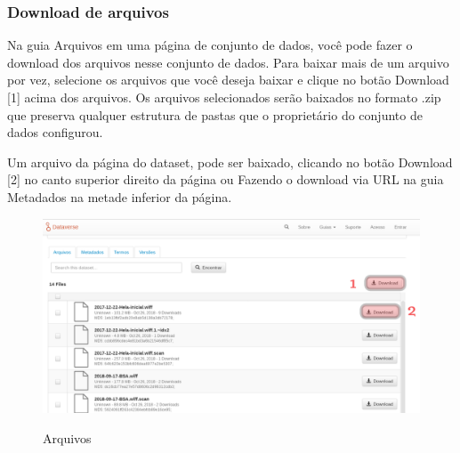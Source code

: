 \documentclass[12pt,hidelinks]{article}
\begin{document}

    	\subsubsection{Download de arquivos}
    	
\qquad Na guia Arquivos em uma página de conjunto de dados, você pode fazer o download dos arquivos nesse conjunto de dados. Para baixar mais de um arquivo por vez, selecione os arquivos que você deseja baixar e clique no botão Download [1] acima dos arquivos. Os arquivos selecionados serão baixados no formato .zip que preserva qualquer estrutura de pastas que o proprietário do conjunto de dados configurou.

Um arquivo da página do dataset, pode ser baixado, clicando no botão Download [2] no canto superior direito da página ou Fazendo o download via URL na guia Metadados na metade inferior da página.

\begin{figure}[H]
\caption{Arquivos}
\centering
    \includegraphics[width=1.0\textwidth]{Prints/p3.png}
    \label{print3}
\end{figure}
\end{document}
